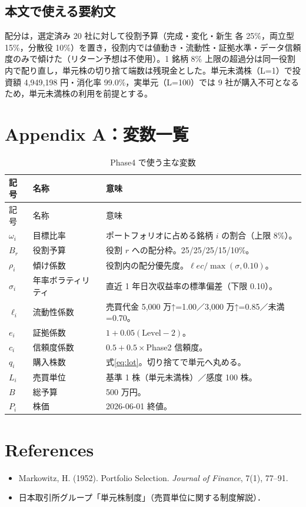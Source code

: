 \documentclass[a4paper,10pt]{article}
\begin{document}
\subsection{本文で使える要約文}
\begin{keybox}
配分は，選定済み 20 社に対して役割予算（完成・変化・新生 各 25\%，両立型 15\%，分散役 10\%）を置き，役割内では値動き・流動性・証拠水準・データ信頼度のみで傾けた（リターン予想は不使用）。1 銘柄 8\% 上限の超過分は同一役割内で配り直し，単元株の切り捨て端数は残現金とした。単元未満株（L=1）で投資額 4{,}949{,}198 円・消化率 99.0\%，実単元（L=100）では 9 社が購入不可となるため，単元未満株の利用を前提とする。
\end{keybox}

\newpage
\section{Appendix A：変数一覧}
\begin{longtable}{p{24mm}p{44mm}p{76mm}}
\caption{Phase4 で使う主な変数}\\
\toprule
記号 & 名称 & 意味 \\
\midrule
\endfirsthead
\toprule
記号 & 名称 & 意味 \\
\midrule
\endhead
$\omega_i$ & 目標比率 & ポートフォリオに占める銘柄 $i$ の割合（上限 8\%）。 \\
$B_r$ & 役割予算 & 役割 $r$ への配分枠。25/25/25/15/10\%。 \\
$\rho_i$ & 傾け係数 & 役割内の配分優先度。$\ell e c/\max(\sigma,0.10)$。 \\
$\sigma_i$ & 年率ボラティリティ & 直近 1 年日次収益率の標準偏差（下限 0.10）。 \\
$\ell_i$ & 流動性係数 & 売買代金 5{,}000 万↑=1.00／3{,}000 万↑=0.85／未満=0.70。 \\
$e_i$ & 証拠係数 & $1+0.05(\text{Level}-2)$。 \\
$c_i$ & 信頼度係数 & $0.5+0.5\times$Phase2 信頼度。 \\
$q_i$ & 購入株数 & 式\eqref{eq:lot}。切り捨てで単元へ丸める。 \\
$L_i$ & 売買単位 & 基準 1 株（単元未満株）／感度 100 株。 \\
$B$ & 総予算 & 500 万円。 \\
$P_i$ & 株価 & 2026-06-01 終値。 \\
\bottomrule
\end{longtable}

\section{References}
\begin{itemize}
\item Markowitz, H. (1952). Portfolio Selection. \emph{Journal of Finance}, 7(1), 77--91.
\item 日本取引所グループ「単元株制度」（売買単位に関する制度解説）．
\end{itemize}
\end{document}

